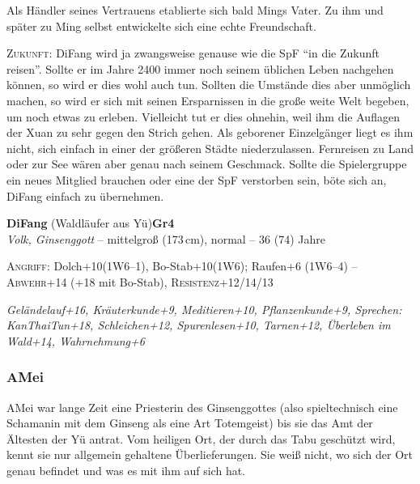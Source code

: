 \documentclass[
a4paper,
twoside,
DIV=calc,
BCOR=4mm,
fontsize=9pt,
twocolumn=on,
titlepage=on,
parskip=half
]{scrartcl}
\begin{document}
Als Händler seines Vertrauens etablierte sich bald Mings Vater. Zu ihm
und später zu Ming selbst entwickelte sich eine echte Freundschaft.

\textsc{Zukunft:} DiFang wird ja zwangsweise genause wie die SpF "`in
die Zukunft reisen"'. Sollte er im Jahre 2400 immer noch seinem
üblichen Leben nachgehen können, so wird er dies wohl auch
tun. Sollten die Umstände dies aber unmöglich machen, so wird er sich
mit seinen Ersparnissen in die große weite Welt begeben, um noch etwas
zu erleben. Vielleicht tut er dies ohnehin, weil ihm die Auflagen der
Xuan zu sehr gegen den Strich gehen. Als geborener Einzelgänger liegt
es ihm nicht, sich einfach in einer der größeren Städte
niederzulassen. Fernreisen zu Land oder zur See wären aber genau nach
seinem Geschmack. Sollte die Spielergruppe ein neues Mitglied brauchen
oder eine der SpF verstorben sein, böte sich an, DiFang einfach zu
übernehmen.

\textbf{DiFang} (Waldläufer aus Yü)\hfill \textbf{Gr4}\\
\emph{Volk, Ginsenggott} -- mittelgroß (173\,cm), normal -- 36 (74) Jahre


\textsc{Angriff:} Dolch+10(1W6--1), Bo-Stab+10(1W6); Raufen+6 (1W6--4)
-- \textsc{Abwehr}+14 (+18 mit Bo-Stab), \textsc{Resistenz}+12/14/13

\emph{Geländelauf+16, Kräuterkunde+9, Meditieren+10, Pflanzenkunde+9,
  Sprechen: KanThaiTun+18, Schleichen+12, Spurenlesen+10, Tarnen+12,
  Überleben im Wald+14, Wahrnehmung+6}

\subsubsection{AMei}

AMei war lange Zeit eine Priesterin des Ginsenggottes (also
spieltechnisch eine Schamanin mit dem Ginseng als eine Art Totemgeist)
bis sie das Amt der Ältesten der Yü antrat. Vom heiligen Ort, der
durch das Tabu geschützt wird, kennt sie nur allgemein gehaltene
Überlieferungen. Sie weiß nicht, wo sich der Ort genau befindet und
was es mit ihm auf sich hat.
\end{document}
